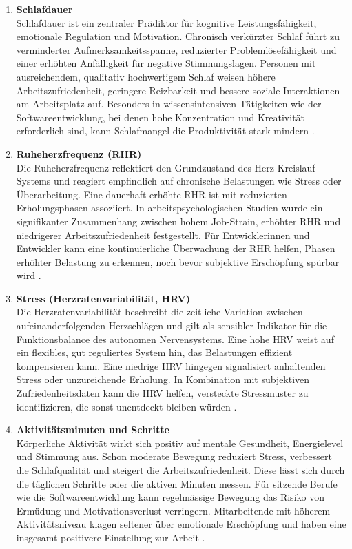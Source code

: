 \documentclass[12pt,a4paper]{report}
\begin{document}
\begin{enumerate}
  \item \textbf{Schlafdauer}\\
        Schlafdauer ist ein zentraler Prädiktor für kognitive Leistungsfähigkeit, emotionale Regulation und Motivation. Chronisch 
        verkürzter Schlaf führt zu verminderter Aufmerksamkeitsspanne, reduzierter Problemlösefähigkeit und einer erhöhten 
        Anfälligkeit für negative Stimmungslagen. Personen mit ausreichendem, qualitativ hochwertigem Schlaf weisen höhere
        Arbeitszufriedenheit, geringere Reizbarkeit und bessere soziale Interaktionen am Arbeitsplatz auf. Besonders in
        wissensintensiven Tätigkeiten wie der Softwareentwicklung, bei denen hohe Konzentration und Kreativität erforderlich sind,
        kann Schlafmangel die Produktivität stark mindern \cite{opoku_sleep_2023}.

  \item \textbf{Ruheherzfrequenz (RHR)}\\
        Die Ruheherzfrequenz reflektiert den Grundzustand des Herz-Kreislauf-Systems und reagiert empfindlich auf chronische 
        Belastungen wie Stress oder Überarbeitung. Eine dauerhaft erhöhte RHR ist mit  reduzierten Erholungsphasen assoziiert.
        In arbeitspsychologischen Studien wurde ein signifikanter Zusammenhang zwischen hohem Job-Strain, erhöhter RHR und niedrigerer Arbeitszufriedenheit festgestellt. Für Entwicklerinnen und Entwickler kann eine kontinuierliche Überwachung der RHR
        helfen, Phasen erhöhter Belastung zu erkennen, noch bevor subjektive Erschöpfung spürbar wird \cite{eriksson_rhr_2016}.

  \item \textbf{Stress (Herzratenvariabilität, HRV)}\\
        Die Herzratenvariabilität beschreibt die zeitliche Variation zwischen aufeinanderfolgenden Herzschlägen und gilt als
        sensibler Indikator für die Funktionsbalance des autonomen Nervensystems. Eine hohe HRV weist auf ein flexibles, gut
        reguliertes System hin, das Belastungen effizient kompensieren kann. Eine niedrige HRV hingegen signalisiert anhaltenden
        Stress oder unzureichende Erholung. In Kombination mit subjektiven Zufriedenheitsdaten kann die HRV helfen, versteckte
        Stressmuster zu identifizieren, die sonst unentdeckt bleiben würden \cite{borchini_hrv_2012}.

  \item \textbf{Aktivitätsminuten und Schritte}\\
        Körperliche Aktivität wirkt sich positiv auf mentale Gesundheit, Energielevel und Stimmung aus. Schon moderate Bewegung
        reduziert Stress, verbessert die Schlafqualität und steigert die Arbeitszufriedenheit. Diese lässt sich durch die täglichen
        Schritte oder die aktiven Minuten messen. Für sitzende Berufe wie die Softwareentwicklung kann regelmässige Bewegung das
        Risiko von Ermüdung und Motivationsverlust verringern. Mitarbeitende mit höherem Aktivitätsniveau klagen seltener über
        emotionale Erschöpfung und haben eine insgesamt positivere Einstellung zur Arbeit \cite{dallmeyer_activity_2023}.
\end{enumerate}
\end{document}
